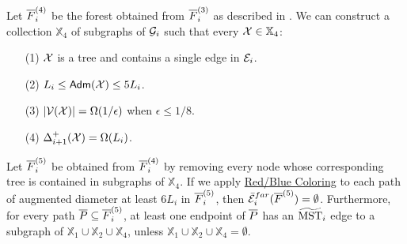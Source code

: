 \begin{lemma}[Step 4]\label{lm:Clustering-Step4} Let $\overline{F}^{(4)}_i$ be the forest obtained from $\overline{F}^{(3)}_i$ as described in . We can construct a collection $\mathbb{X}_4$ of subgraphs of $\mathcal{G}_i$ such that every $\mathcal{X}\in \mathbb{X}_4$:
	\begin{enumerate}[noitemsep]
		\item[(1)] $\mathcal{X}$ is a tree and  contains a single edge in $\mathcal{E}_i$.
		\item[(2)] $L_i \leq \mathsf{Adm}(\mathcal{X})\leq 5L_i$.
		\item[(3)]  $|\mathcal{V}(\mathcal{X})| = \Omega(1/\epsilon)$ when $\epsilon \leq 1/8$. 
		\item[(4)] $\Delta_{i+1}^{+}(\mathcal{X}) = \Omega(L_i)$.
	\end{enumerate}
 Let $\overline{F}^{(5)}_i$ be obtained from $\overline{F}^{(4)}_i$ by removing every node whose corresponding tree is contained in subgraphs of $\mathbb{X}_4$. If we apply \hyperlink{RBColoring}{Red/Blue Coloring} to each path of augmented diameter at least $6L_i$ in $\overline{F}^{(5)}_i$, then $\bar{\mathcal{E}}^{far}_i(\overline{F}^{(5)}) = \emptyset$. Furthermore,  for every path $\overline{P} \subseteq \overline{F}^{(5)}_i$,  at least one endpoint of $\overline{P}$ has an $\widetilde{\mathrm{MST}}_{i}$ edge to a subgraph of $\mathbb{X}_1\cup \mathbb{X}_2\cup \mathbb{X}_4$, unless $\mathbb{X}_1\cup \mathbb{X}_2 \cup \mathbb{X}_4 = \emptyset$. 
\end{lemma}
